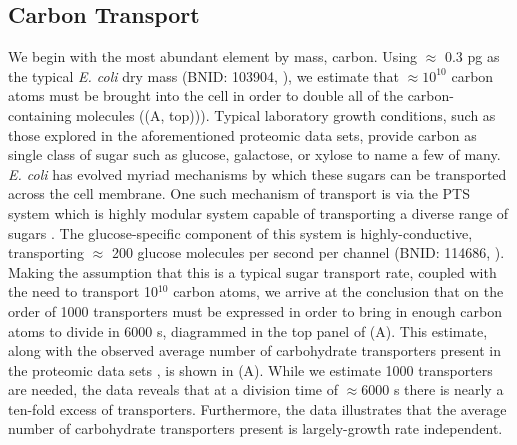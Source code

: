 \subsection{Carbon Transport}
We begin with the most abundant element by mass, carbon. Using $\approx$ 0.3
pg as the typical \textit{E. coli} dry mass (BNID: 103904, \cite{milo2010}),
we estimate that $\approx 10^{10}$ carbon atoms must be brought into the cell
in order to double all of the carbon-containing molecules ((A,
top))). Typical laboratory
growth conditions, such as those explored in the aforementioned proteomic data
sets, provide carbon as single class of sugar such as glucose, galactose, or
xylose to name a few of many. \textit{E. coli} has evolved myriad mechanisms by which these sugars can
be transported across the cell membrane. One such mechanism of transport is via 
the PTS system which is highly modular system capable of transporting a diverse
range of sugars \citep{escalante2012}. The glucose-specific
component of this system is highly-conductive, transporting $\approx$ 200 glucose
molecules per second per channel (BNID: 114686, \cite{milo2010}). Making the
assumption that this is a typical sugar transport rate, coupled with the
need to transport 10$^{10}$ carbon atoms, we arrive at the conclusion that on the
order of 1000 transporters must be expressed in order to bring in enough carbon
atoms to divide in 6000 s, diagrammed in the top panel of (A). This estimate, along with the observed average number
of carbohydrate transporters present in the proteomic data sets
\citep{schmidt2016, peebo2015,valgepea2013,li2014}, is shown in
(A). While we estimate 1000 transporters are needed, the
data reveals that at a division time of $\approx 6000$ s there is nearly a
ten-fold excess of transporters. Furthermore, the data illustrates that the
average number of carbohydrate transporters present is largely-growth rate
independent. 

